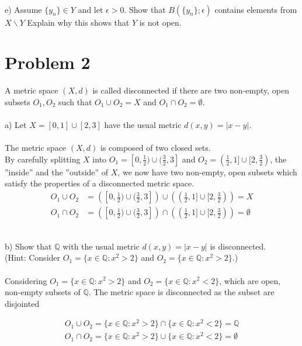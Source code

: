 \documentclass[12pt,letterpaper]{article}
\begin{document}
 
 
 \noindent \\
e) Assume $\{y_n\}\in Y$ and let $\epsilon >0$. Show that $B(\{y_n\};\epsilon)$ contains elements from $X \backslash Y$ Explain why this shows that $Y$ is not open. \\
 


 
 
\section*{Problem 2}

A metric space $(X,d)$ is called disconnected if there are two non-empty, open subsets $O_1, O_2$ such that $O_1 \cup O_2 = X$ and $O_1 \cap O_2 = \emptyset$. \\
\noindent \\
a) Let $X = [0,1] \cup [2,3]$ have the usual metric $d(x,y) = |x-y|$. \\
\noindent \\
The metric space $(X,d)$ is composed of two closed sets. \\
By carefully splitting $X$ into $O_1= [0,\frac{1}{2}) \cup (\frac{3}{2},3]$ and $O_2 = (\frac{1}{2},1]\cup [2,\frac{3}{2})$, the ''inside'' and the ''outside'' of $X$, we now have two non-empty, open subsets which satisfy the properties of a disconnected metric space.
\begin{align*}
	O_1 \cup O_2  &= \left([0,\frac{1}{2}) \cup (\frac{3}{2},3]\right) \cup \left((\frac{1}{2},1]\cup [2,\frac{3}{2})\right)    = X \\
	O_1 \cap O_2  &= \left( [0,\frac{1}{2}) \cup (\frac{3}{2},3]\right) \cap \left( (\frac{1}{2},1]\cup [2,\frac{3}{2})\right)  = \emptyset
\end{align*}



\noindent \\
b) Show that $\mathbb{Q}$ with the usual metric $d(x,y)=|x-y|$ is disconnected. \\
(Hint: Consider $O_1=\{x\in\mathbb{Q} : x^2 > 2\}$ and $O_2=\{x\in\mathbb{Q} : x^2 > 2\}$.)\\

\noindent \\
Considering $O_1=\{x\in\mathbb{Q} : x^2 > 2\}$ and $O_2=\{x\in\mathbb{Q} : x^2 < 2\}$, which are open, non-empty subsets of $\mathbb{Q}$. The metric space is disconnected as the subset are disjointed

\begin{align*}
	O_1 \cup O_2 = \{x\in\mathbb{Q} : x^2 > 2\}\cap\{x\in\mathbb{Q} : x^2 < 2\} = \mathbb{Q} \\
	O_1 \cap O_2 = \{x\in\mathbb{Q} : x^2 > 2\}\cup\{x\in\mathbb{Q} : x^2 < 2\} = \emptyset \\
\end{align*}
\end{document}
